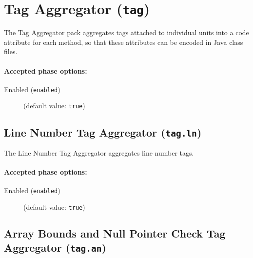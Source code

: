 \documentclass{article}
\begin{document}
\section{Tag Aggregator ({\tt tag})}


\par

The Tag Aggregator pack aggregates tags attached to individual units
into a code attribute for each method, so that these attributes can be
encoded in Java class files.


\paragraph{Accepted phase options:} 

\begin{description}

\item[Enabled ({\tt enabled})]
(default value: {\tt true})






\end{description}

\subsection{Line Number Tag Aggregator ({\tt tag.ln})}


\par

The Line Number Tag Aggregator aggregates line number
tags.


\paragraph{Accepted phase options:} 

\begin{description}

\item[Enabled ({\tt enabled})]
(default value: {\tt true})






\end{description}

\subsection{Array Bounds and Null Pointer Check Tag Aggregator ({\tt tag.an})}


\par
\end{document}
